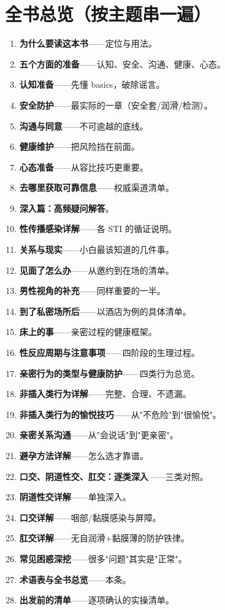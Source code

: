 \documentclass[12pt,UTF8,openany]{ctexbook}
\begin{document}
\section{全书总览（按主题串一遍）}

\begin{enumerate}[leftmargin=2em,itemsep=0.3em]
  \item \textbf{为什么要读这本书}——定位与用法。
  \item \textbf{五个方面的准备}——认知、安全、沟通、健康、心态。
  \item \textbf{认知准备}——先懂 basics，破除谣言。
  \item \textbf{安全防护}——最实际的一章（安全套/润滑/检测）。
  \item \textbf{沟通与同意}——不可逾越的底线。
  \item \textbf{健康维护}——把风险挡在前面。
  \item \textbf{心态准备}——从容比技巧更重要。
  \item \textbf{去哪里获取可靠信息}——权威渠道清单。
  \item \textbf{深入篇：高频疑问解答}。
  \item \textbf{性传播感染详解}——各 STI 的循证说明。
  \item \textbf{关系与现实}——小白最该知道的几件事。
  \item \textbf{见面了怎么办}——从邀约到在场的清单。
  \item \textbf{男性视角的补充}——同样重要的一半。
  \item \textbf{到了私密场所后}——以酒店为例的具体清单。
  \item \textbf{床上的事}——亲密过程的健康框架。
  \item \textbf{性反应周期与注意事项}——四阶段的生理过程。
  \item \textbf{亲密行为的类型与健康防护}——四类行为总览。
  \item \textbf{非插入类行为详解}——完整、合理、不遗漏。
  \item \textbf{非插入类行为的愉悦技巧}——从"不危险"到"很愉悦"。
  \item \textbf{亲密关系沟通}——从"会说话"到"更亲密"。
  \item \textbf{避孕方法详解}——怎么选才靠谱。
  \item \textbf{口交、阴道性交、肛交：逐类深入}——三类对照。
  \item \textbf{阴道性交详解}——单独深入。
  \item \textbf{口交详解}——咽部/黏膜感染与屏障。
  \item \textbf{肛交详解}——无自润滑+黏膜薄的防护铁律。
  \item \textbf{常见困惑深挖}——很多"问题"其实是"正常"。
  \item \textbf{术语表与全书总览}——本条。
  \item \textbf{出发前的清单}——逐项确认的实操清单。
\end{enumerate}
\end{document}
